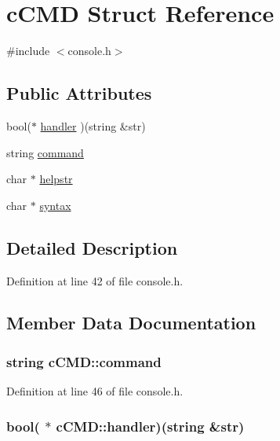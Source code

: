 \hypertarget{structc_c_m_d}{\section{c\-C\-M\-D Struct Reference}
\label{structc_c_m_d}
}


{\ttfamily \#include $<$console.\-h$>$}

\subsection*{Public Attributes}
\begin{DoxyCompactItemize}
\item 
bool($\ast$ \hyperlink{structc_c_m_d_a84110034ccf285181df425f91a7f2481}{handler} )(string \&str)
\item 
string \hyperlink{structc_c_m_d_a8b2d47534b6a9a59ebe840b881ecf139}{command}
\item 
char $\ast$ \hyperlink{structc_c_m_d_a3bf87b48a17d5153fe779c48502a3f15}{helpstr}
\item 
char $\ast$ \hyperlink{structc_c_m_d_afdf6b992caaf1b6cd0f6ede278b98797}{syntax}
\end{DoxyCompactItemize}


\subsection{Detailed Description}


Definition at line 42 of file console.\-h.



\subsection{Member Data Documentation}
\hypertarget{structc_c_m_d_a8b2d47534b6a9a59ebe840b881ecf139}{
\subsubsection[{command}]{\setlength{\rightskip}{0pt plus 5cm}string c\-C\-M\-D\-::command}}\label{structc_c_m_d_a8b2d47534b6a9a59ebe840b881ecf139}


Definition at line 46 of file console.\-h.

\hypertarget{structc_c_m_d_a84110034ccf285181df425f91a7f2481}{
\subsubsection[{handler}]{\setlength{\rightskip}{0pt plus 5cm}bool( $\ast$ c\-C\-M\-D\-::handler)(string \&str)}}\label{structc_c_m_d_a84110034ccf285181df425f91a7f2481}


